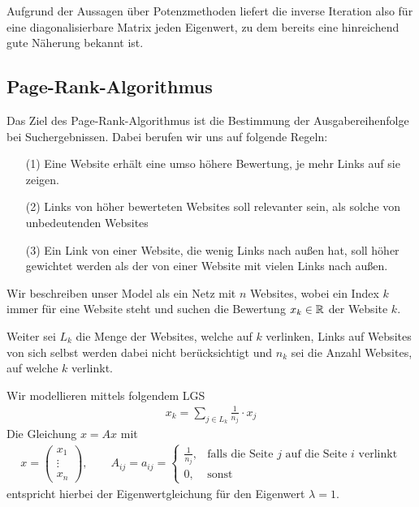 Aufgrund der Aussagen über Potenzmethoden liefert die inverse Iteration also für eine diagonalisierbare Matrix
jeden Eigenwert, zu dem bereits eine hinreichend gute Näherung bekannt ist.

\subsection{Page-Rank-Algorithmus}
Das Ziel des Page-Rank-Algorithmus ist die Bestimmung der Ausgabereihenfolge bei Suchergebnissen. Dabei berufen 
wir uns auf folgende Regeln:

\begin{enumerate}
  \item[(1)] Eine Website erhält eine umso höhere Bewertung, je mehr Links auf sie zeigen.
  \item[(2)] Links von höher bewerteten Websites soll relevanter sein, als solche von unbedeutenden Websites
  \item[(3)] Ein Link von einer Website, die wenig Links nach außen hat, soll höher gewichtet werden als der
    von einer Website mit vielen Links nach außen. 
\end{enumerate}

Wir beschreiben unser Model als ein Netz mit $n$ Websites, wobei ein Index $k$ immer für eine Website steht und suchen 
die Bewertung $x_k\in\mathbb R$ der Website $k$. 

Weiter sei $L_k$ die Menge der Websites, welche auf $k$ verlinken, 
Links auf Websites von sich selbst werden dabei nicht berücksichtigt und 
$n_k$ sei die Anzahl Websites, auf welche $k$ verlinkt.

Wir modellieren mittels folgendem LGS
%
\begin{align*}
  x_k = \sum_{j\in L_k}\tfrac{1}{n_j}\cdot x_j
\end{align*}
%
Die Gleichung $x=Ax$ mit 
\begin{align*}x = \begin{pmatrix}
  x_1 \\ \vdots \\ x_n
\end{pmatrix}, \qquad A_{ij} = a_{ij} = \begin{cases}
  \tfrac{1}{n_j}, & \text{falls die Seite } j \text{ auf die Seite } i \text{ verlinkt} \\
  0, & \text{sonst}
\end{cases}\end{align*}
entspricht hierbei der Eigenwertgleichung für den Eigenwert $\lambda=1$. \\


